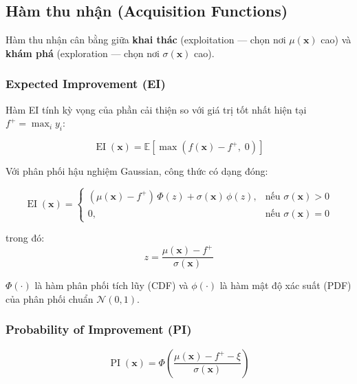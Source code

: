 \documentclass[12pt,a4paper]{article}
\DeclareMathOperator{\EI}{EI}
\DeclareMathOperator{\PI}{PI}
\begin{document}
\subsection{Hàm thu nhận (Acquisition Functions)}

Hàm thu nhận cân bằng giữa \textbf{khai thác} (exploitation --- chọn nơi
$\mu(\mathbf{x})$ cao) và \textbf{khám phá} (exploration --- chọn nơi
$\sigma(\mathbf{x})$ cao).

\subsubsection{Expected Improvement (EI)}

Hàm EI tính kỳ vọng của phần cải thiện so với giá trị tốt nhất hiện tại
$f^+ = \max_{i} y_i$:

\begin{equation}
    \EI(\mathbf{x}) = \mathbb{E}\!\left[\max\!\left(f(\mathbf{x}) - f^+,\; 0\right)\right]
    \label{eq:ei_definition}
\end{equation}

\noindent Với phân phối hậu nghiệm Gaussian, công thức có dạng đóng:

\begin{equation}
    \boxed{
    \EI(\mathbf{x}) =
    \begin{cases}
        (\mu(\mathbf{x}) - f^+)\,\Phi(z) + \sigma(\mathbf{x})\,\phi(z),
            & \text{nếu } \sigma(\mathbf{x}) > 0 \\
        0, & \text{nếu } \sigma(\mathbf{x}) = 0
    \end{cases}
    }
    \label{eq:ei_closed}
\end{equation}

\noindent trong đó:
\begin{equation}
    z = \frac{\mu(\mathbf{x}) - f^+}{\sigma(\mathbf{x})}
    \label{eq:ei_z}
\end{equation}

$\Phi(\cdot)$ là hàm phân phối tích lũy (CDF) và $\phi(\cdot)$ là hàm mật độ
xác suất (PDF) của phân phối chuẩn $\mathcal{N}(0, 1)$.

\subsubsection{Probability of Improvement (PI)}

\begin{equation}
    \PI(\mathbf{x}) = \Phi\!\left(\frac{\mu(\mathbf{x}) - f^+ - \xi}{\sigma(\mathbf{x})}\right)
    \label{eq:pi}
\end{equation}
\end{document}
